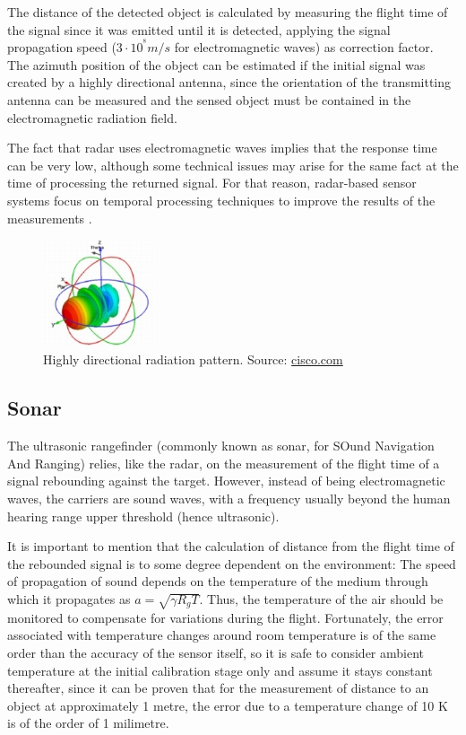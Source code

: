 The distance of the detected object is calculated by measuring the flight time of the signal since it was emitted until it is detected, applying the signal propagation speed ($3 \cdot 10^{^8} m/s$ for electromagnetic waves) as correction factor.
The azimuth position of the object can be estimated if the initial signal was created by a highly directional antenna, since the orientation of the transmitting antenna can be measured and the sensed object must be contained in the electromagnetic radiation field.

The fact that radar uses electromagnetic waves implies that the response time can be very low, although some technical issues may arise for the same fact at the time of processing the returned signal.
For that reason, radar-based sensor systems focus on temporal processing techniques to improve the results of the measurements \cite{krolik2005}.

\begin{figure}[htbp]
	\centering
	\includegraphics[width=0.3\textwidth]{./figures/antennaPattern.jpg}
	\caption{Highly directional radiation pattern. {\footnotesize Source: \url{cisco.com}}}
	\label{fig:antenna}
\end{figure}

\subsection{Sonar}

The ultrasonic rangefinder (commonly known as sonar, for SOund Navigation And Ranging) relies, like the radar, on the measurement of the flight time of a signal rebounding against the target.
However, instead of being electromagnetic waves, the carriers are sound waves, with a frequency usually beyond the human hearing range upper threshold (hence ultrasonic).

It is important to mention that the calculation of distance from the flight time of the rebounded signal is to some degree dependent on the environment:
The speed of propagation of sound depends on the temperature of the medium through which it propagates as $a=\sqrt{\gamma R_g T}$.
Thus, the temperature of the air should be monitored to compensate for variations during the flight.
Fortunately, the error associated with temperature changes around room temperature is of the same order than the accuracy of the sensor itself, so it is safe to consider ambient temperature at the initial calibration stage only and assume it stays constant thereafter, since it can be proven that for the measurement of distance to an object at approximately 1 metre, the error due to a temperature change of 10 K is of the order of 1 milimetre.

